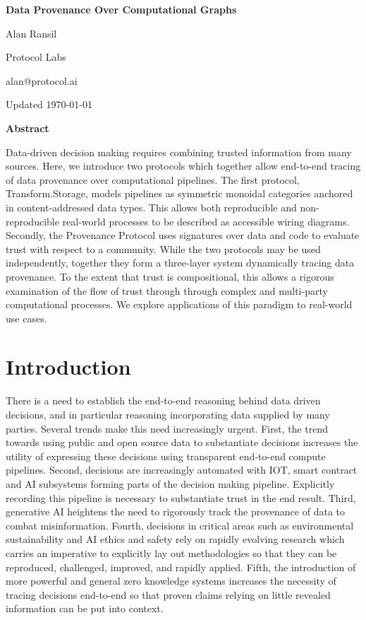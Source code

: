 \documentclass[9pt, oneside]{article}   	%
\begin{document}
\newpage


\begin{center}
\Large{\textbf{Data Provenance Over Computational Graphs}}
\vspace{1 cm}

\normalsize{}
Alan Ransil

Protocol Labs

alan@protocol.ai

\vspace{1 cm}
Updated \today

\vspace{1 cm}
\Large{\textbf{Abstract}}

\end{center}

\noindent Data-driven decision making requires combining trusted information from many sources. Here, we introduce two protocols which together allow end-to-end tracing of data provenance over computational pipelines. The first protocol, Transform.Storage, models pipelines as symmetric monoidal categories anchored in content-addressed data types. This allows both reproducible and non-reproducible real-world processes to be described as accessible wiring diagrams. Secondly, the Provenance Protocol uses signatures over data and code to evaluate trust with respect to a community.  While the two protocols may be used independently, together they form a three-layer system dynamically tracing data provenance. To the extent that trust is compositional, this allows a rigorous examination of the flow of trust through through complex and multi-party computational processes. We explore applications of this paradigm to real-world use cases.



\setlength{\parskip}{0.1\baselineskip} %
\section{Introduction}

There is a need to establish the end-to-end reasoning behind data driven decisions, and in particular reasoning incorporating data supplied by many parties. Several trends make this need increasingly urgent. First, the trend towards using public and open source data to substantiate decisions increases the utility of expressing these decisions using transparent end-to-end compute pipelines. Second, decisions are increasingly automated with IOT, smart contract and AI subsystems forming parts of the decision making pipeline. Explicitly recording this pipeline is necessary to substantiate trust in the end result. Third, generative AI heightens the need to rigorously track the provenance of data to combat misinformation. Fourth, decisions in critical areas such as environmental sustainability and AI ethics and safety rely on rapidly evolving research which carries an imperative to explicitly lay out methodologies so that they can be reproduced, challenged, improved, and rapidly applied. Fifth, the introduction of more powerful and general zero knowledge systems increases the necessity of tracing decisions end-to-end so that proven claims relying on little revealed information can be put into context.
\end{document}
